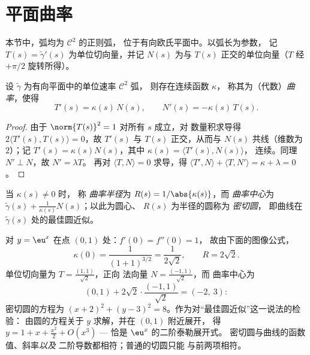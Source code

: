 \section{平面曲率}

本节中，弧均为 $\mathcal{C}^2$ 的正则弧，
位于有向欧氏平面中。以弧长为参数，
记 $T(s) = \tilde\gamma'(s)$ 为单位切向量，并记 $N(s)$
为与 $T(s)$ 正交的单位向量（$T$ 经
$+\pi/2$ 旋转所得）。

\begin{theorem}[平面弗雷内公式]\label{thm:b2:curves:frenet2d}
设 $\tilde\gamma$ 为有向平面中的单位速率 $\mathcal{C}^2$ 弧，
则存在连续函数 $\kappa$，
称其为（代数）\emph{曲率}，使得
\[
T'(s) = \kappa(s)\, N(s),
\qquad
N'(s) = -\kappa(s)\, T(s).
\]
\end{theorem}

\begin{proof}
由于 $\norm{T(s)}^2 = 1$ 对所有 $s$ 成立，对
数量积求导得 $2\langle T'(s), T(s)\rangle = 0$，故 $T'(s)$ 与
$T(s)$ 正交，从而与 $N(s)$ 共线（维数为 $2$）；记 $T'(s)
= \kappa(s) N(s)$，其中 $\kappa(s) = \langle T'(s), N(s)\rangle$，
连续。同理 $N' \perp N$，故 $N' = \lambda T$。
再对 $\langle T, N\rangle = 0$ 求导，得 $\langle T', N\rangle +
\langle T, N'\rangle = \kappa + \lambda = 0$。
\end{proof}

\begin{definition}\label{def:b2:curves:curvature}
当 $\kappa(s) \neq 0$ 时，
称 \emph{曲率半径}为 $R(s) =
1/\abs{\kappa(s)}$，而
\emph{曲率中心}为
$\tilde\gamma(s) + \frac{1}{\kappa(s)} N(s)$；以此为圆心、
$R(s)$ 为半径的圆称为 \emph{密切圆}，
即曲线在 $\tilde\gamma(s)$ 处的最佳圆近似。
\end{definition}

\begin{example}\label{ex:b2:curves:oscexp}
对 $y = \eu^x$ 在点 $(0, 1)$ 处：$f'(0) = f''(0) = 1$，
故由下面的图像公式，
\[
\kappa(0) = \frac{1}{(1 + 1)^{3/2}} = \frac1{2\sqrt2},
\qquad R = 2\sqrt2 .
\]
单位切向量为 $T = \frac{(1, 1)}{\sqrt2}$，正向
法向量 $N = \frac{(-1, 1)}{\sqrt2}$，而
曲率中心为
\[
(0, 1) + 2\sqrt2\cdot\frac{(-1, 1)}{\sqrt2} = (-2,\ 3) :
\]
密切圆的方程为 $(x + 2)^2 + (y - 3)^2 =
8$。作为对“最佳圆近似”这一说法的检验：
由圆的方程关于 $y$ 求解，并在 $(0,1)$ 附近展开，
得 $y = 1 + x + \frac{x^2}2 + O(x^3)$ ---
恰是 $\eu^x$ 的二阶泰勒展开式。
密切圆与曲线的函数值、斜率\emph{以及}
二阶导数都相符；普通的切圆只能
与前两项相符。
\end{example}


